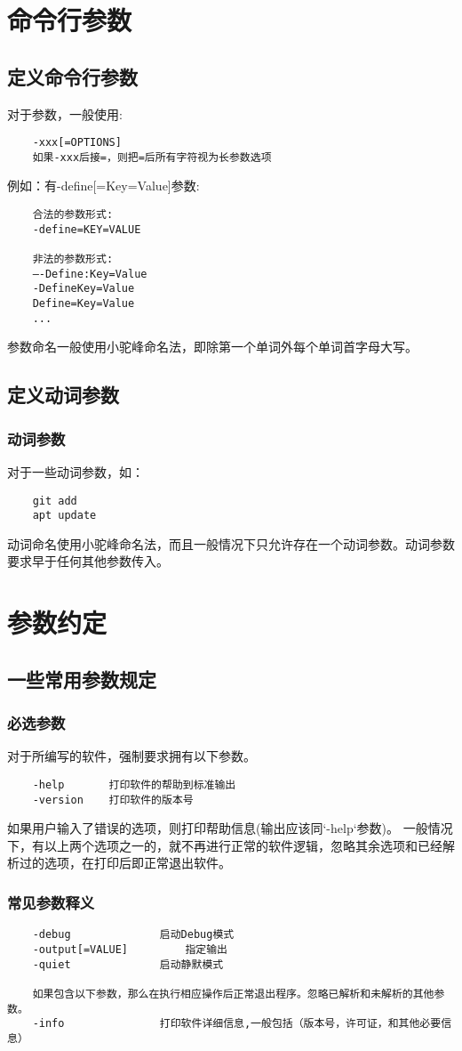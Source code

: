 \chapter{命令行参数}
\section{定义命令行参数}

对于参数，一般使用:
\begin{lstlisting}
	-xxx[=OPTIONS]
	如果-xxx后接=，则把=后所有字符视为长参数选项	
\end{lstlisting}

例如：有-define[=Key=Value]参数:
\begin{lstlisting}
	合法的参数形式:
	-define=KEY=VALUE
	
	非法的参数形式:
	—-Define:Key=Value
	-DefineKey=Value
	Define=Key=Value
	...
\end{lstlisting}
参数命名一般使用小驼峰命名法，即除第一个单词外每个单词首字母大写。



\section{定义动词参数}
\subsection{动词参数}
对于一些动词参数，如：
\begin{lstlisting}
	git add
	apt update
\end{lstlisting}
动词命名使用小驼峰命名法，而且一般情况下只允许存在一个动词参数。动词参数要求早于任何其他参数传入。


\chapter{参数约定}

\section{一些常用参数规定}

\subsection{必选参数}

对于所编写的软件，强制要求拥有以下参数。
\label{_PARAM_HELP_RULE_}
\begin{lstlisting}
	-help		打印软件的帮助到标准输出
	-version	打印软件的版本号
\end{lstlisting}
如果用户输入了错误的选项，则打印帮助信息(输出应该同`-help`参数)。
一般情况下，有以上两个选项之一的，就不再进行正常的软件逻辑，忽略其余选项和已经解析过的选项，在打印后即正常退出软件。


\subsection{常见参数释义}
\begin{lstlisting}
	-debug				启动Debug模式
	-output[=VALUE]			指定输出	
	-quiet				启动静默模式
	
	如果包含以下参数，那么在执行相应操作后正常退出程序。忽略已解析和未解析的其他参数。
	-info 				打印软件详细信息,一般包括（版本号，许可证，和其他必要信息）
\end{lstlisting}
